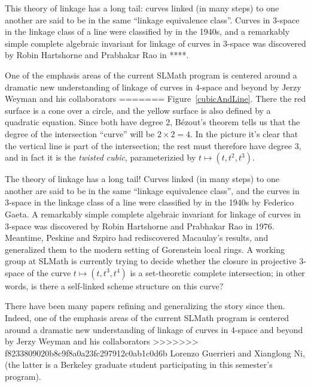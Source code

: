 \documentclass[11pt, oneside]{article}   	%
\begin{document}
This theory of linkage has a long tail: curves linked (in many steps) to one another are said to be in the same ``linkage equivalence class''. Curves in 3-space in the linkage class of a line were classified by in the 1940s, and a remarkably simple complete algebraic invariant for linkage of curves in 3-space was discovered by Robin Hartshorne and Prabhakar Rao in ****. 

One of the emphasis areas of the current SLMath program is centered around a dramatic new understanding of linkage of curves in 4-space and beyond by Jerzy Weyman and his collaborators
=======
Figure~\ref{cubicAndLine}. There the red surface is a cone over a circle, and the yellow surface
is also defined by a quadratic equation. Since both have degree 2, B\'ezout's theorem tells us that the
degree of the intersection ``curve'' will be $2\times 2 = 4$. In the picture it's clear that the vertical line
is part of the intersection; the rest must therefore have degree 3, and in fact it is the \emph{twisted cubic},
parameterizied by $t\mapsto (t, t^{2}, t^{3})$.


The theory of linkage has a long tail! Curves linked (in many steps) to one another are said to be in the same ``linkage equivalence class'', and the curves in 3-space in the linkage class of a line were classified by in the 1940s by Federico Gaeta. A remarkably simple complete algebraic invariant for linkage of curves in 3-space was discovered by Robin Hartshorne and Prabhakar Rao in 1976. 
Meantime, Peskine and Szpiro had rediscovered Macaulay's results, and generalized them to the 
modern setting of Gorenstein local rings. A working group at SLMath is currently trying to
decide whether the closure in projective 3-space of the curve $t \mapsto (t, t^{3}, t^{4})$ is a set-theoretic complete intersection; in other words, is there a self-linked scheme structure on this curve?

There have been many papers refining and generalizing the story since then. Indeed, one of the emphasis areas of the current SLMath program is centered around a dramatic new understanding of linkage of curves in 4-space and beyond by Jerzy Weyman and his collaborators
>>>>>>> f8233809020b8c9f8a0a23fc297912c0ab1c0d6b
Lorenzo Guerrieri and Xianglong Ni, (the latter is a Berkeley graduate student participating in this semester's program).
\end{document}

